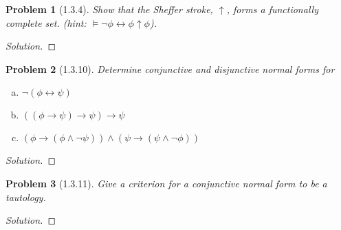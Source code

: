 \documentclass[letter]{article}
\newtheorem{problem}{Problem}
\theoremstyle{definition}
\newenvironment{solution}
{\begin{proof}[Solution]}
	{\end{proof}}
\begin{document}
\begin{problem}[1.3.4] Show that the Sheffer stroke, $\uparrow$, forms a functionally complete set. (hint: $\models \neg \phi \leftrightarrow \phi \uparrow \phi$).
\end{problem}
\begin{solution}
\end{solution}


\begin{problem}[1.3.10] Determine conjunctive and disjunctive normal forms for
\begin{enumerate}[(a)]
    \item $\neg (\phi \leftrightarrow \psi)$
    \item $((\phi \to \psi) \to \psi) \to \psi$
    \item $(\phi \to (\phi \land \neg \psi)) \land (\psi \to (\psi \land \neg \phi))$
\end{enumerate}
\end{problem}
\begin{solution}
\end{solution}

\begin{problem}[1.3.11] Give a criterion for a conjunctive normal form to be a tautology.
\end{problem}
\begin{solution}
\end{solution}
\end{document}
